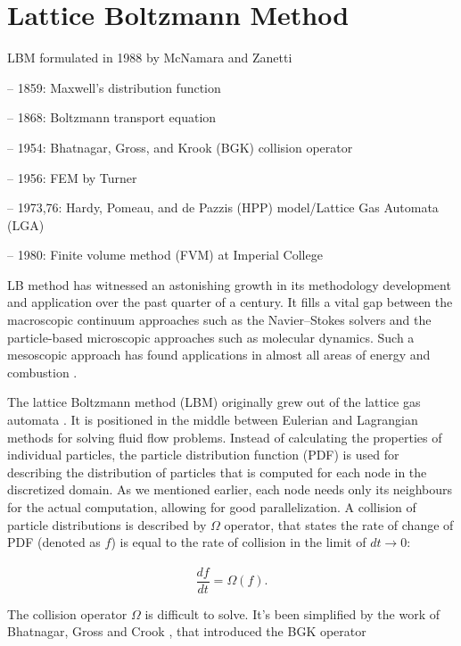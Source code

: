 \section{Lattice Boltzmann Method}

LBM	formulated in 1988 by	McNamara and	Zanetti

– 1859:	Maxwell's	distribution	function	

– 1868:	Boltzmann	transport	equation	

– 1954:	Bhatnagar,	Gross,	and	Krook	(BGK)	collision	operator	

– 1956:	FEM	by	Turner	

– 1973,76:	Hardy,	Pomeau,	and	de	Pazzis	(HPP)	model/Lattice	
Gas	Automata	(LGA)	

– 1980:	Finite	volume	method	(FVM)	at	Imperial	College	

LB method has witnessed an astonishing growth in its methodology development and application over the past quarter of a century. It fills a vital gap between the macroscopic continuum approaches such as the Navier–Stokes solvers and the particle-based microscopic approaches such as molecular dynamics. Such a mesoscopic approach has found applications in almost all areas of energy and combustion \cite{liLatticeBoltzmannMethods2016a}.

The lattice Boltzmann method (LBM) originally grew out of the lattice gas automata \cite{succi2001lattice}. It is positioned in the middle between Eulerian and Lagrangian methods for solving fluid flow problems. Instead of calculating the properties of individual particles, the particle distribution function (PDF) is used for describing the distribution of particles that is computed for each node in the discretized domain. As we mentioned earlier, each node needs only its neighbours for the actual computation, allowing for good parallelization. A collision of particle distributions is described by $\Omega$ operator, that states the rate of change of PDF (denoted as $f$) is equal to the rate of collision in the limit of $dt \xrightarrow[]{} 0$:

\begin{equation}
	\label{eq:collision-operator}
	\frac{df}{dt} = \Omega(f).
\end{equation}

The collision operator $\Omega$ is difficult to solve. It's been simplified by the work of Bhatnagar, Gross and Crook \cite{bhatnagarModelCollisionProcesses1954}, that introduced the BGK operator

